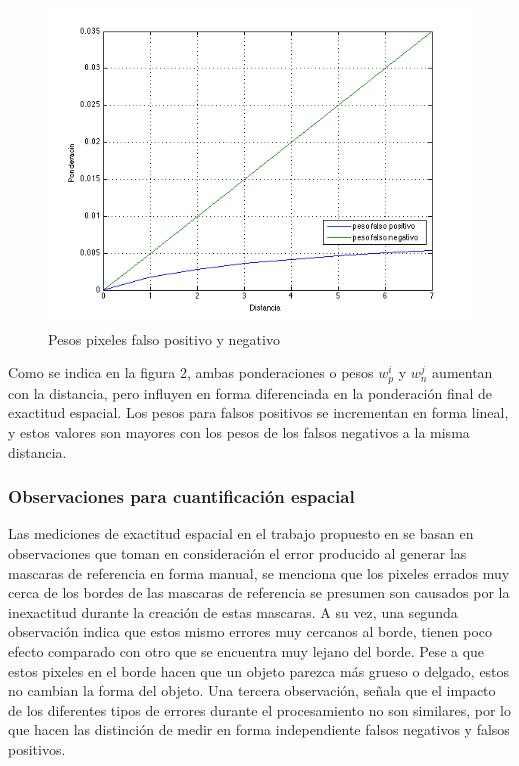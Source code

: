 \begin{figure}[!ht]
\centering
\includegraphics[scale=0.4]{img/PesosFalsoPositivoNegativo}
\caption{Pesos pixeles falso positivo y negativo}
\label{fig:Contexto espacial pesos para pixeles falso positivo y negativo}
\end{figure}

Como se indica en la figura 2, ambas ponderaciones o pesos $w^i_p$ y $w^j_n$ aumentan con la distancia, pero influyen en forma diferenciada en la ponderación final de exactitud espacial. Los pesos para falsos positivos se incrementan en forma lineal, y estos valores son mayores con los pesos de los falsos negativos a la misma distancia.

\subsubsection{Observaciones para cuantificación espacial}

Las mediciones de exactitud espacial en el trabajo propuesto en \cite{liu_metrics_2011}  se basan en observaciones que toman en consideración el error producido al generar las mascaras de referencia en forma manual, se menciona que los pixeles errados muy cerca de los bordes de las mascaras de referencia se presumen son causados por la inexactitud durante la creación de estas mascaras. A su vez, una segunda observación indica que estos mismo errores muy cercanos al borde, tienen poco efecto comparado con otro que se encuentra muy lejano del borde. Pese a que estos pixeles en el borde hacen que un objeto parezca más grueso o delgado, estos no cambian la forma del objeto. Una tercera observación, señala que el impacto de los diferentes tipos de errores durante el procesamiento no son similares, por lo que hacen las distinción de medir en forma independiente falsos negativos y falsos positivos. 

